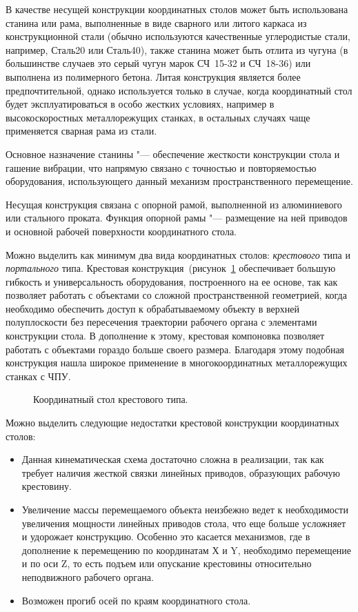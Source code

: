 В качестве несущей конструкции координатных столов может быть использована станина или рама, выполненные в виде сварного или литого каркаса из конструкционной стали (обычно используются качественные углеродистые стали, например, Сталь20 или Сталь40), также станина может быть отлита из чугуна (в большинстве случаев это серый чугун марок СЧ~15-32 и СЧ~18-36) или выполнена из полимерного бетона. Литая конструкция является более предпочтительной, однако используется только в случае, когда координатный стол будет эксплуатироваться в особо жестких условиях, например в высокоскоростных металлорежущих станках, в остальных случаях чаще применяется сварная рама из стали.

Основное назначение станины "--- обеспечение жесткости конструкции стола и гашение вибрации, что напрямую связано с точностью и повторяемостью оборудования, использующего данный механизм пространственного перемещение.

Несущая конструкция связана с опорной рамой, выполненной из алюминиевого или стального проката. Функция опорной рамы "--- размещение на ней приводов и основной рабочей поверхности координатного стола.

Можно выделить как минимум два вида координатных столов: \textit{крестового} типа и \textit{портального} типа. Крестовая конструкция~(рисунок~\cref{fig:cross} обеспечивает большую гибкость и универсальность оборудования, построенного на ее основе, так как позволяет работать с объектами со сложной пространственной геометрией, когда необходимо обеспечить доступ к обрабатываемому объекту в верхней полуплоскости без пересечения траектории рабочего органа с элементами конструкции стола. В дополнение к этому, крестовая компоновка позволяет работать с объектами гораздо больше своего размера. Благодаря этому подобная конструкция нашла широкое применение в многокоординатных металлорежущих станках с ЧПУ.

\begin{figure}[ht]
	\caption{Координатный стол крестового типа.}\label{fig:cross}
\end{figure}

Можно выделить следующие недостатки крестовой конструкции координатных столов:

\begin{itemize}
	\item Данная кинематическая схема достаточно сложна в реализации, так как требует наличия жесткой связки линейных приводов, образующих рабочую крестовину.
	
	\item Увеличение массы перемещаемого объекта неизбежно ведет к необходимости увеличения мощности линейных приводов стола, что еще больше усложняет и удорожает конструкцию. Особенно это касается механизмов, где в дополнение к перемещению по координатам Х и Y, необходимо перемещение и по оси Z, то есть подъем или опускание крестовины относительно неподвижного рабочего органа. 
	
	\item Возможен прогиб осей по краям координатного стола.
\end{itemize}

